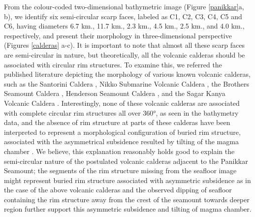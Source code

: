 \documentclass[twocolumn]{article}
\begin{document}
\begin{minipage}{\linewidth}%
	\vspace{7.5mm} %
	\label{calderas}
	\vspace{4mm} %
\end{minipage}

From the colour-coded two-dimensional bathymetric image (Figure \ref{panikkar}a, b), we identify six semi-circular scarp faces, labeled as C1, C2, C3, C4, C5 and C6, having diameters 6.7 km., 11.7 km., 2.3 km., 4.5 km., 2.5 km., and 4.0 km., respectively, and present their morphology in three-dimensional perspective (Figures \ref{calderas} a-c). It is important to note that almost all these scarp faces are semi-circular in nature, but theoretically, all the volcanic calderas should be associated with circular rim structures. To examine this, we referred the published literature depicting the morphology of various known volcanic calderas, such as  the Santorini Caldera \citep{Nomikou2012}, Nikko Submarine Volcanic Caldera \citep{Global_Volcanism_Program1990}, the Brothers Seamount Caldera \citep{Stagpoole2016}, Henderson Seamount Caldera \citep{Taylor1980}, and the Sagar Kanya Volcanic Caldera \citep{Bijesh2021}. Interestingly, none of these volcanic calderas are associated with complete circular rim structures all over 360°, as seen in the bathymetry data, and the absence of rim structure at parts of these calderas have been interpreted to represent a morphological configuration of buried rim structure, associated with the asymmetrical subsidence resulted by tilting of the magma chamber \citep{Kennedy2004}. We believe, this explanation reasonably holds good to explain the semi-circular nature of the postulated volcanic calderas adjacent to the Panikkar Seamount; the segments of the rim structure missing from the seafloor image might represent buried rim structure associated with asymmetric subsidence as in the case of the above volcanic calderas and the observed dipping of seafloor containing the rim structure away from the crest of the seamount towards deeper region further support this asymmetric subsidence and tilting of magma chamber.
\end{document}
